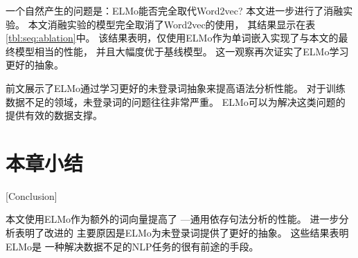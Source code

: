 一个自然产生的问题是：ELMo能否完全取代Word2vec?
本文进一步进行了消融实验。
本文消融实验的模型完全取消了Word2vec的使用，
其结果显示在表\ref{tbl:seq:ablation}中。
该结果表明，仅使用ELMo作为单词嵌入实现了与本文的最终模型相当的性能，
并且大幅度优于基线模型。
这一观察再次证实了ELMo学习更好的抽象。

前文展示了ELMo通过学习更好的未登录词抽象来提高语法分析性能。
对于训练数据不足的领域，未登录词的问题往往非常严重。
ELMo可以为解决这类问题的提供有效的数据支撑。

\section{本章小结}[Conclusion]

本文使用ELMo作为额外的词向量提高了
---通用依存句法分析的性能。
进一步分析表明了改进的
主要原因是ELMo为未登录词提供了更好的抽象。
这些结果表明
ELMo是
一种解决数据不足的NLP任务的很有前途的手段。